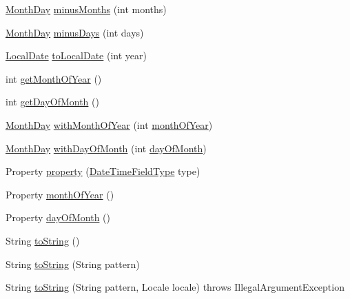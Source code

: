 \begin{DoxyCompactItemize}
\item 
\hyperlink{classorg_1_1joda_1_1time_1_1_month_day}{Month\-Day} \hyperlink{classorg_1_1joda_1_1time_1_1_month_day_a0b908c870c8e751541c21a2fa92a74a8}{minus\-Months} (int months)
\item 
\hyperlink{classorg_1_1joda_1_1time_1_1_month_day}{Month\-Day} \hyperlink{classorg_1_1joda_1_1time_1_1_month_day_ae155c15ddc91e1224d651cbbda53a7ba}{minus\-Days} (int days)
\item 
\hyperlink{classorg_1_1joda_1_1time_1_1_local_date}{Local\-Date} \hyperlink{classorg_1_1joda_1_1time_1_1_month_day_acb93f532bb7c0280dde679f93982def4}{to\-Local\-Date} (int year)
\item 
int \hyperlink{classorg_1_1joda_1_1time_1_1_month_day_a15a20aa5c31fbbf2fa12616b5233b5e5}{get\-Month\-Of\-Year} ()
\item 
int \hyperlink{classorg_1_1joda_1_1time_1_1_month_day_ac59979dfe8c4b6cd88826548123146ea}{get\-Day\-Of\-Month} ()
\item 
\hyperlink{classorg_1_1joda_1_1time_1_1_month_day}{Month\-Day} \hyperlink{classorg_1_1joda_1_1time_1_1_month_day_ae6ba1f5947d54c9aac3f585ca3bcec26}{with\-Month\-Of\-Year} (int \hyperlink{classorg_1_1joda_1_1time_1_1_month_day_a168860baf6a0667446ed82b2c6bf3b41}{month\-Of\-Year})
\item 
\hyperlink{classorg_1_1joda_1_1time_1_1_month_day}{Month\-Day} \hyperlink{classorg_1_1joda_1_1time_1_1_month_day_a399ea52be20f32c37d4817527d9d673b}{with\-Day\-Of\-Month} (int \hyperlink{classorg_1_1joda_1_1time_1_1_month_day_aae2ab1f7118fac7b890d39ae25f5fd51}{day\-Of\-Month})
\item 
Property \hyperlink{classorg_1_1joda_1_1time_1_1_month_day_a45bf52144b6088f31d5ec2850b73143c}{property} (\hyperlink{classorg_1_1joda_1_1time_1_1_date_time_field_type}{Date\-Time\-Field\-Type} type)
\item 
Property \hyperlink{classorg_1_1joda_1_1time_1_1_month_day_a168860baf6a0667446ed82b2c6bf3b41}{month\-Of\-Year} ()
\item 
Property \hyperlink{classorg_1_1joda_1_1time_1_1_month_day_aae2ab1f7118fac7b890d39ae25f5fd51}{day\-Of\-Month} ()
\item 
String \hyperlink{classorg_1_1joda_1_1time_1_1_month_day_a6edd8bc3fce0ecb25dae47ecdfef6e73}{to\-String} ()
\item 
String \hyperlink{classorg_1_1joda_1_1time_1_1_month_day_a429a803cf6e970ea647fed3821bf56cd}{to\-String} (String pattern)
\item 
String \hyperlink{classorg_1_1joda_1_1time_1_1_month_day_a781e8b1ced16b2351e989bfb93de9903}{to\-String} (String pattern, Locale locale)  throws Illegal\-Argument\-Exception 
\end{DoxyCompactItemize}
